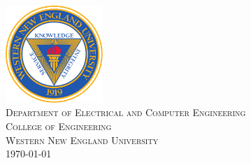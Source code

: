 \thispagestyle{empty}
\begin{titlepage}
    \begin{center}
        \vspace*{0pt}
        \makeatletter    
        \Huge
        \textbf{\@title}\\
        \vspace{1ex}
        \Large
        \vspace{5ex}
        \textbf{\@author}\\
        \vfill
        \vspace{3ex}
        \includegraphics[width=0.275\textwidth]{graphics/Seal_of_Western_New_England_University.png}\\
        \vspace{2ex}
        \large
        \textsc{Department of Electrical and Computer Engineering}\\
        \textsc{College of Engineering}\\
        \textsc{Western New England University}\\
        \vspace{.5cm}
        \normalsize \today
        \makeatother
    \end{center}

    \newpage

    \thispagestyle{empty}
    { }
\end{titlepage}